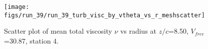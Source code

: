 \begin{figure}[H]
\centering
\texttt{[image: figs/run\_39/run\_39\_turb\_visc\_by\_vtheta\_vs\_r\_meshscatter]}
\caption{Scatter plot of mean total viscosity $\nu$ vs radius at $z/c$=8.50, $V_{free}$=30.87, station 4.}
\label{fig:run_39_turb_visc_by_vtheta_vs_r_meshscatter}
\end{figure}


